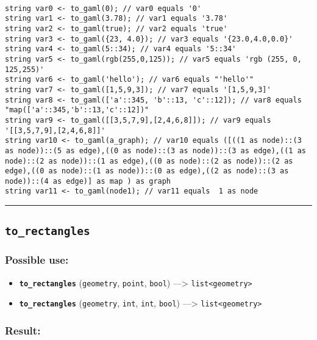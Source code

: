 \documentclass[]{book}
\providecommand{\tightlist}{%
  \setlength{\itemsep}{0pt}\setlength{\parskip}{0pt}}
\theoremstyle{definition}
\theoremstyle{definition}
\theoremstyle{definition}
\theoremstyle{remark}
\begin{document}
\begin{verbatim}
 
string var0 <- to_gaml(0); // var0 equals '0' 
string var1 <- to_gaml(3.78); // var1 equals '3.78' 
string var2 <- to_gaml(true); // var2 equals 'true' 
string var3 <- to_gaml({23, 4.0}); // var3 equals '{23.0,4.0,0.0}' 
string var4 <- to_gaml(5::34); // var4 equals '5::34' 
string var5 <- to_gaml(rgb(255,0,125)); // var5 equals 'rgb (255, 0, 125,255)' 
string var6 <- to_gaml('hello'); // var6 equals "'hello'" 
string var7 <- to_gaml([1,5,9,3]); // var7 equals '[1,5,9,3]' 
string var8 <- to_gaml(['a'::345, 'b'::13, 'c'::12]); // var8 equals "map(['a'::345,'b'::13,'c'::12])" 
string var9 <- to_gaml([[3,5,7,9],[2,4,6,8]]); // var9 equals '[[3,5,7,9],[2,4,6,8]]' 
string var10 <- to_gaml(a_graph); // var10 equals ([((1 as node)::(3 as node))::(5 as edge),((0 as node)::(3 as node))::(3 as edge),((1 as node)::(2 as node))::(1 as edge),((0 as node)::(2 as node))::(2 as edge),((0 as node)::(1 as node))::(0 as edge),((2 as node)::(3 as node))::(4 as edge)] as map ) as graph 
string var11 <- to_gaml(node1); // var11 equals  1 as node
\end{verbatim}

\begin{center}\rule{0.5\linewidth}{\linethickness}\end{center}

\subsection{\texorpdfstring{\texttt{to\_rectangles}}{to\_rectangles}}\label{to_rectangles}

\subsubsection{Possible use:}\label{possible-use-522}

\begin{itemize}
\tightlist
\item
  \textbf{\texttt{to\_rectangles}} (\texttt{geometry}, \texttt{point},
  \texttt{bool}) ---\textgreater{}
  \texttt{list\textless{}geometry\textgreater{}}
\item
  \textbf{\texttt{to\_rectangles}} (\texttt{geometry}, \texttt{int},
  \texttt{int}, \texttt{bool}) ---\textgreater{}
  \texttt{list\textless{}geometry\textgreater{}}
\end{itemize}

\subsubsection{Result:}\label{result-504}
\end{document}

